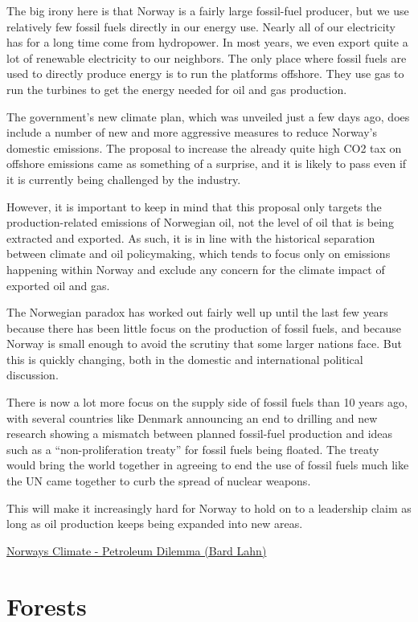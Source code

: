 \documentclass[
]{book}
\begin{document}
The big irony here is that Norway is a fairly large fossil-fuel producer, but we use relatively few fossil fuels directly in our energy use. Nearly all of our electricity has for a long time come from hydropower. In most years, we even export quite a lot of renewable electricity to our neighbors.
The only place where fossil fuels are used to directly produce energy is to run the platforms offshore. They use gas to run the turbines to get the energy needed for oil and gas production.

The government's new climate plan, which was unveiled just a few days ago, does include a number of new and more aggressive measures to reduce Norway's domestic emissions. The proposal to increase the already quite high CO2 tax on offshore emissions came as something of a surprise, and it is likely to pass even if it is currently being challenged by the industry.

However, it is important to keep in mind that this proposal only targets the production-related emissions of Norwegian oil, not the level of oil that is being extracted and exported. As such, it is in line with the historical separation between climate and oil policymaking, which tends to focus only on emissions happening within Norway and exclude any concern for the climate impact of exported oil and gas.

The Norwegian paradox has worked out fairly well up until the last few years because there has been little focus on the production of fossil fuels, and because Norway is small enough to avoid the scrutiny that some larger nations face. But this is quickly changing, both in the domestic and international political discussion.

There is now a lot more focus on the supply side of fossil fuels than 10 years ago, with several countries like Denmark announcing an end to drilling and new research showing a mismatch between planned fossil-fuel production and ideas such as a ``non-proliferation treaty'' for fossil fuels being floated. The treaty would bring the world together in agreeing to end the use of fossil fuels much like the UN came together to curb the spread of nuclear weapons.

This will make it increasingly hard for Norway to hold on to a leadership claim as long as oil production keeps being expanded into new areas.

\href{https://www.vox.com/22227063/norway-oil-gas-climate-change}{Norways Climate - Petroleum Dilemma (Bard Lahn)}

\hypertarget{forests}{%
\chapter{Forests}\label{forests}}
\end{document}
